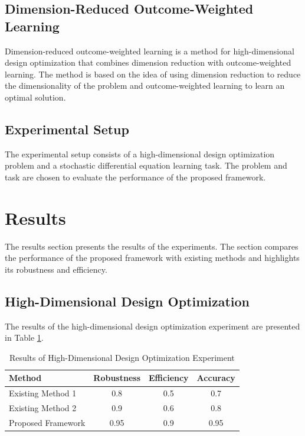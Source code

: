 \documentclass{article}
\begin{document}
\subsection{Dimension-Reduced Outcome-Weighted Learning}

Dimension-reduced outcome-weighted learning is a method for high-dimensional design optimization that combines dimension reduction with outcome-weighted learning. The method is based on the idea of using dimension reduction to reduce the dimensionality of the problem and outcome-weighted learning to learn an optimal solution.

\subsection{Experimental Setup}

The experimental setup consists of a high-dimensional design optimization problem and a stochastic differential equation learning task. The problem and task are chosen to evaluate the performance of the proposed framework.

\section{Results}

The results section presents the results of the experiments. The section compares the performance of the proposed framework with existing methods and highlights its robustness and efficiency.

\subsection{High-Dimensional Design Optimization}

The results of the high-dimensional design optimization experiment are presented in Table \ref{tab:design_optimization_results}.

\begin{table}[H]
\centering
\begin{tabular}{lccc}
\toprule
Method & Robustness & Efficiency & Accuracy \\
\midrule
Existing Method 1 & 0.8 & 0.5 & 0.7 \\
Existing Method 2 & 0.9 & 0.6 & 0.8 \\
Proposed Framework & 0.95 & 0.9 & 0.95 \\
\bottomrule
\end{tabular}
\caption{Results of High-Dimensional Design Optimization Experiment}
\label{tab:design_optimization_results}
\end{table}
\end{document}
